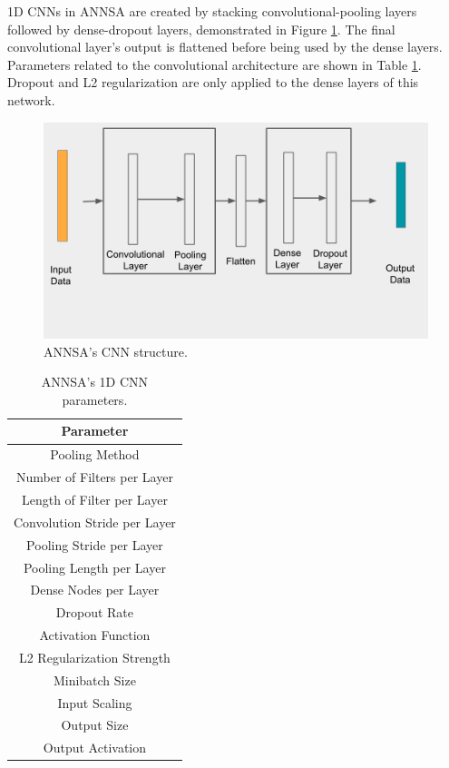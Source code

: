 1D CNNs in ANNSA are created by stacking convolutional-pooling layers followed by dense-dropout layers, demonstrated in Figure \ref{fig:annsa_cnn}. The final convolutional layer's output is flattened before being used by the dense layers. Parameters related to the convolutional architecture are shown in Table \ref{table:annsa_cnn_params}. Dropout and L2 regularization are only applied to the dense layers of this network.

\begin{figure}[H]
\centering
\includegraphics[trim=0 75 20 0,clip,width=0.8\linewidth]{images/annsa_cnn.png}
\caption{ANNSA's CNN structure.}
\label{fig:annsa_cnn}
\end{figure}

\begin{table}[H]
\centering
\caption{ANNSA's 1D CNN parameters.}
\begin{tabular}{c}
\hline
Parameter \\ \hline
Pooling Method \\
Number of Filters per Layer \\
Length of Filter per Layer \\
Convolution Stride per Layer \\
Pooling Stride per Layer \\
Pooling Length per Layer \\
Dense Nodes per Layer \\
Dropout Rate \\
Activation Function \\
L2 Regularization Strength \\ 
Minibatch Size \\ 
Input Scaling \\
Output Size \\
Output Activation \\ \hline
\end{tabular}
\label{table:annsa_cnn_params}
\end{table}


